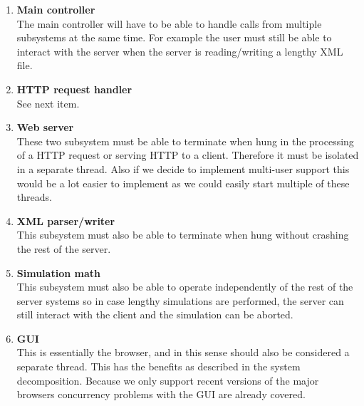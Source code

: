 \begin{enumerate}
\item \textbf{Main controller} \\
The main controller will have to be able to handle calls from multiple subsystems at the same time. For example the user must still be able to interact with the server when the server is reading/writing a lengthy XML file.\item \textbf{HTTP request handler} \\
See next item.
\item \textbf{Web server} \\
These two subsystem must be able to terminate when hung in the processing of a HTTP request or serving HTTP to a client. Therefore it must be isolated in a separate thread. Also if we decide to implement multi-user support this would be a lot easier to implement as we could easily start multiple of these threads. 
\item \textbf{XML parser/writer} \\
This subsystem must also be able to terminate when hung without crashing the rest of the server.
\item \textbf{Simulation math} \\
This subsystem must also be able to operate independently of the rest of the server systems so in case lengthy simulations are performed, the server can still interact with the client and the simulation can be aborted.
\item \textbf{GUI} \\
This is essentially the browser, and in this sense should also be considered a separate thread. This has the benefits as described in the system decomposition. Because we only support recent versions of the major browsers concurrency problems with the GUI are already covered.\end{enumerate}